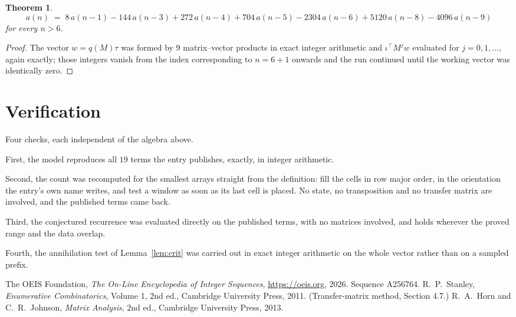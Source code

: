 \documentclass[11pt,a4paper]{article}
\theoremstyle{plain}
\newtheorem{theorem}{Theorem}
\theoremstyle{definition}
\begin{document}
\begin{theorem}
\[
a(n)\;=\;8\,a(n-1) - 144\,a(n-3) + 272\,a(n-4) + 704\,a(n-5) - 2304\,a(n-6) + 5120\,a(n-8) - 4096\,a(n-9)
\]
for every $n>6$.
\end{theorem}

\begin{proof}
The vector $w=q(M)\tau$ was formed by $9$ matrix--vector products in exact integer
arithmetic and $\iota^{\!\top}M^{j}w$ evaluated for $j=0,1,\dots$, again exactly; those
integers vanish from the index corresponding to $n=6+1$ onwards and the run continued
until the working vector was identically zero.
\end{proof}

\section{Verification}

Four checks, each independent of the algebra above.

First, the model reproduces all $19$ terms the entry publishes, exactly, in integer
arithmetic.

Second, the count was recomputed for the smallest arrays straight from the definition: fill the
cells in row major order, in the orientation the entry's own name writes, and test a window as
soon as its last cell is placed. No state, no transposition and no transfer matrix are
involved, and the published terms came back.

Third, the conjectured recurrence was evaluated directly on the published terms, with no
matrices involved, and holds wherever the proved range and the data overlap.

Fourth, the annihilation test of Lemma~\ref{lem:crit} was carried out in exact integer
arithmetic on the whole vector rather than on a sampled prefix.

\begin{thebibliography}{9}
 The OEIS Foundation, \emph{The On-Line Encyclopedia of Integer
Sequences}, \url{https://oeis.org}, 2026. Sequence A256764.
 R.~P.~Stanley, \emph{Enumerative Combinatorics}, Volume 1, 2nd ed.,
Cambridge University Press, 2011. (Transfer-matrix method, Section 4.7.)
 R.~A.~Horn and C.~R.~Johnson, \emph{Matrix Analysis}, 2nd ed., Cambridge
University Press, 2013.
\end{thebibliography}
\end{document}
